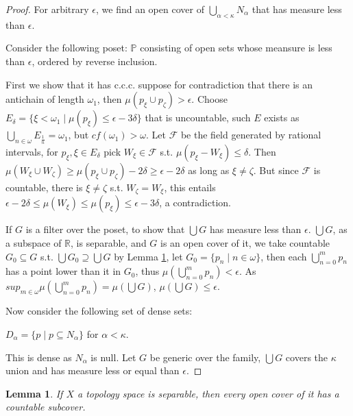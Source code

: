 \documentclass{article}
\newtheorem{lemma}{Lemma}
\newcommand{\bbP}{\mathbb{P}}
\begin{document}
\begin{proof}
    For arbitrary $\epsilon$, we find an open cover of $\bigcup_{\alpha<\kappa}N_\alpha$ that has measure less than $\epsilon$.

    Consider the following poset: $\bbP$ consisting of open sets whose meansure is less than $\epsilon$, ordered by reverse inclusion.

    First we show that it has c.c.c. suppose for contradiction that there is an antichain of length $\omega_1$, then $\mu(p_\xi\cup p_\zeta)>\epsilon$. Choose $E_\delta = \{\xi<\omega_1\mid \mu(p_\xi)\leq \epsilon - 3\delta\}$ that is uncountable, such $E$ exists as $\bigcup_{n\in \omega} E_{\frac{1}{n}} = \omega_1$, but $cf(\omega_1)>\omega$. Let $\mathcal{F}$ be the field generated by rational intervals, for $p_\xi, \xi\in E_\delta$ pick $W_\xi\in \mathcal{F}$ s.t. $\mu(p_\xi - W_\xi) \leq \delta$. Then $\mu(W_\xi\cup W_\zeta) \geq \mu(p_\xi\cup p_\zeta) - 2\delta \geq \epsilon - 2\delta$ as long as $\xi\neq \zeta$. But since $\mathcal{F}$ is countable, there is $\xi\neq \zeta$ s.t. $W_\zeta = W_\xi$, this entails $\epsilon - 2\delta\leq \mu(W_\xi)\leq \mu(p_\xi)\leq \epsilon - 3\delta$, a contradiction.

    If $G$ is a filter over the poset, to show that $\bigcup G$ has measure less than $\epsilon$. $\bigcup G$, as a subspace of $\mathbb{R}$, is separable, and $G$ is an open cover of it, we take countable $G_0\subseteq G$ s.t. $\bigcup G_0\supseteq \bigcup G$ by Lemma \ref{lem:second-countable-entails-Lindelof}, let $G_0 = \{p_n\mid n\in \omega\}$, then each $\bigcup^m_{n = 0}p_n$ has a point lower than it in $G_0$, thus $\mu(\bigcup^m_{n = 0}p_n)< \epsilon$. As $sup_{m\in \omega}\mu(\bigcup^m_{n = 0}p_n) = \mu(\bigcup G)$, $\mu(\bigcup G) \leq \epsilon$. 

    Now consider the following set of dense sets:

    $D_\alpha = \{p\mid p\subseteq N_\alpha\}$ for $\alpha<\kappa$.

    This is dense as $N_\alpha$ is null. Let $G$ be generic over the family, $\bigcup G$ covers the $\kappa$ union and has measure less or equal than $\epsilon$.
\end{proof}

\begin{lemma}\label{lem:second-countable-entails-Lindelof}
    If $X$ a topology space is separable, then every open cover of it has a countable subcover.
\end{lemma}
\end{document}

